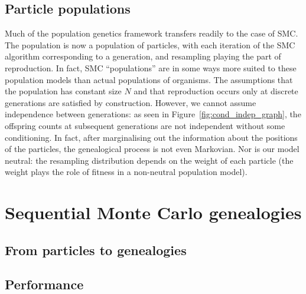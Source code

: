 

\subsection{Particle populations}
Much of the population genetics framework transfers readily to the case of SMC. The population is now a population of particles, with each iteration of the SMC algorithm corresponding to a generation, and resampling playing the part of reproduction.
In fact, SMC ``populations'' are in some ways more suited to these population models than actual populations of organisms.
The assumptions that the population has constant size $N$ and that reproduction occurs only at discrete generations are satisfied by construction.
However, we cannot assume independence between generations: as seen in Figure~\ref{fig:cond_indep_graph}, the offspring counts at subsequent generations are not independent without some conditioning. In fact, after marginalising out the information about the positions of the particles, the genealogical process is not even Markovian.
Nor is our model neutral: the resampling distribution depends on the weight of each particle (the weight plays the role of fitness in a non-neutral population model).

\section{Sequential Monte Carlo genealogies}

\subsection{From particles to genealogies}

\subsection{Performance}


